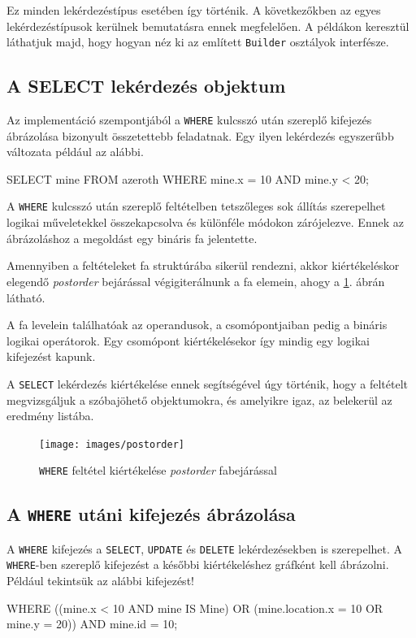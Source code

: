 Ez minden lekérdezéstípus esetében így történik. A következőkben az egyes lekérdezéstípusok kerülnek bemutatásra ennek megfelelően. A példákon keresztül láthatjuk majd, hogy hogyan néz ki az említett \texttt{Builder} osztályok interfésze.

\subsection{A SELECT lekérdezés objektum}

Az implementáció szempontjából a \texttt{WHERE} kulcsszó után szereplő kifejezés ábrázolása bizonyult összetettebb feladatnak. Egy ilyen lekérdezés egyszerűbb változata például az alábbi.
\begin{sql}
SELECT mine FROM azeroth WHERE mine.x = 10 AND mine.y < 20;
\end{sql}

A \texttt{WHERE} kulcsszó után szereplő feltételben tetszőleges sok állítás szerepelhet logikai műveletekkel összekapcsolva és különféle módokon zárójelezve. Ennek az ábrázoláshoz a megoldást egy bináris fa jelentette.

Amennyiben a feltételeket fa struktúrába sikerül rendezni, akkor kiértékeléskor elegendő \textit{postorder} bejárással végigiterálnunk a fa elemein, ahogy a \ref{fig:postorder}. ábrán látható.

A fa levelein találhatóak az operandusok, a csomópontjaiban pedig a bináris logikai operátorok. Egy csomópont kiértékelésekor így mindig egy logikai kifejezést kapunk.

A \texttt{SELECT} lekérdezés kiértékelése ennek segítségével úgy történik, hogy a feltételt megvizsgáljuk a szóbajöhető objektumokra, és amelyikre igaz, az belekerül az eredmény listába.

\begin{figure}[htb]
	\begin{center}
		\texttt{[image: images/postorder]}
		\caption{\texttt{WHERE} feltétel kiértékelése \textit{postorder} fabejárással}
		\label{fig:postorder}
	\end{center}
\end{figure}

\subsection{A \texttt{WHERE} utáni kifejezés ábrázolása}

A \texttt{WHERE} kifejezés a \texttt{SELECT}, \texttt{UPDATE} és \texttt{DELETE} lekérdezésekben is szerepelhet. A \texttt{WHERE}-ben szereplő kifejezést a későbbi kiértékeléshez gráfként kell ábrázolni. Például tekintsük az alábbi kifejezést!
\begin{sql}
WHERE ((mine.x < 10 AND mine IS Mine)
  OR (mine.location.x = 10 OR mine.y = 20)) AND mine.id = 10;
\end{sql}

